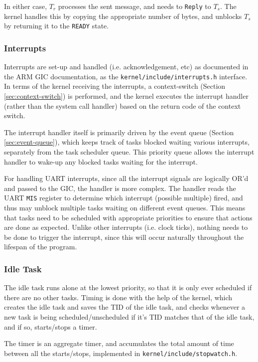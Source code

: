 \documentclass[12pt, titlepage]{article}
\begin{document}
    In either case, $T_r$ processes the sent message, and needs to \verb`Reply` to $T_s$. The kernel handles this by copying the appropriate number of bytes, and unblocks $T_s$ by returning it to the \verb`READY` state.
    
    \subsubsection{Interrupts}
    \label{sec:interrupt}
    Interrupts are set-up and handled (i.e. acknowledgement, etc) as documented in the ARM GIC documentation, as the \verb`kernel/include/interrupts.h` interface. In terms of the kernel receiving the interrupts, a context-switch (Section \ref{sec:context-switch}) is performed, and the kernel executes the interrupt handler (rather than the system call handler) based on the return code of the context switch.
    
    The interrupt handler itself is primarily driven by the event queue (Section \ref{sec:event-queue}), which keeps track of tasks blocked waiting various interrupts, separately from the task scheduler queue. This priority queue allows the interrupt handler to wake-up any blocked tasks waiting for the interrupt.
    
    For handling UART interrupts, since all the interrupt signals are logically OR'd and passed to the GIC, the handler is more complex. The handler reads the UART \verb`MIS` register to determine which interrupt (possible multiple) fired, and thus may unblock multiple tasks waiting on different event queues. This means that tasks need to be scheduled with appropriate priorities to ensure that actions are done as expected. Unlike other interrupts (i.e. clock ticks), nothing needs to be done to trigger the interrupt, since this will occur naturally throughout the lifespan of the program.
    
    \subsubsection{Idle Task}
    \label{sec:idle-task}
    The idle task runs alone at the lowest priority, so that it is only ever scheduled if there are no other tasks. Timing is done with the help of the kernel, which creates the idle task and saves the TID of the idle task, and checks whenever a new task is being scheduled/unscheduled if it's TID matches that of the idle task, and if so, starts/stops a timer.
    
    The timer is an aggregate timer, and accumulates the total amount of time between all the starts/stops, implemented in \verb`kernel/include/stopwatch.h`.
    
\end{document}

